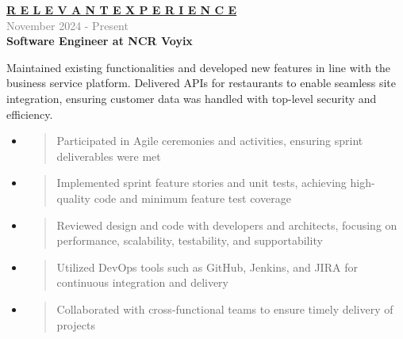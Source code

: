\documentclass[letterpage]{article}
\begin{document}
\begin{minipage}[t]{0.61\linewidth}
\vspace{2pt}
\textbf{\fontsize{14px}{1px}\selectfont
  \ul{R E L E V A N T \:\: E X P E R I E N C E}
}\\

\vspace{4px}
\textcolor{gray}{November 2024 - Present}\\
\textbf{\textsf{Software Engineer at NCR Voyix}}\\
\raggedright
Maintained existing functionalities and developed new features in line with the business service platform. Delivered APIs for restaurants to enable seamless site integration, ensuring customer data was handled with top-level security and efficiency.
\begin{itemize}[leftmargin=*,labelindent=1mm,labelsep=0mm]
\item
  \begin{quote}
  \raggedright
  Participated in Agile ceremonies and activities, ensuring sprint deliverables were met
  \end{quote}
\item
  \begin{quote}
  \raggedright
  Implemented sprint feature stories and unit tests, achieving high-quality code and minimum feature test coverage
  \end{quote}
\item
  \begin{quote}
  \raggedright
  Reviewed design and code with developers and architects, focusing on performance, scalability, testability, and supportability
  \end{quote}
\item
  \begin{quote}
  \raggedright
  Utilized DevOps tools such as GitHub, Jenkins, and JIRA for continuous integration and delivery
  \end{quote}
\item
  \begin{quote}
  \raggedright
  Collaborated with cross-functional teams to ensure timely delivery of projects
  \end{quote}
\end{itemize}


\end{minipage}
\end{document}
